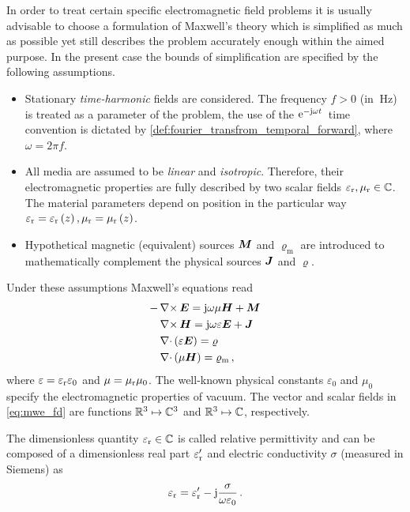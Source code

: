 In order to treat certain specific electromagnetic field problems it is usually
advisable to choose a formulation of Maxwell's theory which is simplified as
much as possible yet still describes the problem accurately enough within the
aimed purpose.
In the present case the bounds of simplification are specified by the following
assumptions.
\begin{itemize}
	\item Stationary \emph{time-harmonic} fields are considered.
	The frequency $f > 0$ (in $\SI{}{\hertz}$) is treated as a parameter of the
	problem, the use of the $\mathrm{e}^{-\mathrm{j} \omega t}\,$ time convention is dictated by
	\cref{def:fourier_transfrom_temporal_forward}, where $\omega = 2\pi f$.
	\item All media are assumed to be \emph{linear} and \emph{isotropic}.
	Therefore, their electromagnetic properties are fully described by two scalar
	fields $\varepsilon_{\mathrm{r}}, \mu_{\mathrm{r}} \in \mathbb{C}$.
	The material parameters depend on position in the particular way
	$\varepsilon_{\mathrm{r}} = \varepsilon_{\mathrm{r}}\left(z\right), \mu_{\mathrm{r}} = \mu_{\mathrm{r}}\left(z\right)$.
	\item Hypothetical magnetic (equivalent) sources $\pvec{M}$ and
	$\varrho_\mathrm{m}$ are introduced to mathematically complement the
	physical sources $\pvec{J}$ and $\varrho$.
\end{itemize}

Under these assumptions Maxwell's equations read \cite{Harrington2001,Chew1999}
\begin{subequations}\label{eq:mwe_fd}
	\begin{align}
		-&\curl \pvec{E}
		= \im\omega\mu\pvec{H} + \pvec{M} \label{eq:mwe_fd_faraday} \\
		&\curl \pvec{H}
		= \im\omega\varepsilon\pvec{E} + \pvec{J} \label{eq:mwe_fd_ampere} \\
		&\divergence \left(\varepsilon\pvec{E}\right)
		= \varrho \label{eq:mwe_fd_gauss} \\
		&\divergence \left(\mu\pvec{H}\right) 
		= \varrho_\mathrm{m} \,, \label{eq:mwe_fd_gauss_magnetic}
	\end{align}
\end{subequations}
where $\varepsilon = \varepsilon_{\mathrm{r}} \varepsilon_0$ and $\mu = \mu_{\mathrm{r}} \mu_0$.
The well-known physical constants $\varepsilon_0$ and $\mu_0$ specify the
electromagnetic properties of vacuum.
The vector and scalar fields in \eqref{eq:mwe_fd} are functions
$\mathbb{R}^3 \mapsto \mathbb{C}^3$ and $\mathbb{R}^3 \mapsto \mathbb{C}$, respectively.

The dimensionless quantity $\varepsilon_{\mathrm{r}} \in \mathbb{C}$ is called relative permittivity 
and can be composed of a dimensionless real part $\varepsilon_{\mathrm{r}}^\prime$ and electric
conductivity $\sigma$ (measured in Siemens) as \cite[43]{Jin2015}
\begin{equation}
	\varepsilon_{\mathrm{r}} = \varepsilon_{\mathrm{r}}^\prime - \mathrm{j} \frac{\sigma}{\omega \varepsilon_0}
	\, . 
\end{equation}

